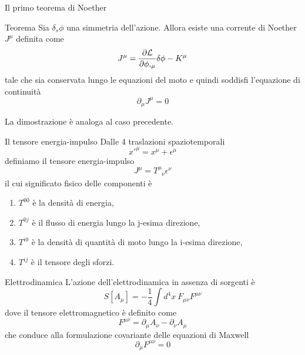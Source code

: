 \begin{frame}{Il primo teorema di Noether}
    \begin{block}{Teorema}
        Sia $\delta_s \phi$ una simmetria dell'azione. Allora esiste una corrente di Noether $J^\mu$ definita come
        \begin{equation*}
            J^\mu = \frac{\partial\mathcal L}{\partial\phi,_\mu} \delta \phi - K^\mu
        \end{equation*}
            tale che sia conservata lungo le equazioni del moto e quindi soddisfi l'equazione di continuità
        \begin{equation*} 
            \partial_\mu J^\mu = 0
        \end{equation*}
    \end{block}

    La dimostrazione è analoga al caso precedente.
\end{frame}

\begin{frame}{Il tensore energia-impulso}
    Dalle 4 traslazioni spaziotemporali
    \begin{equation*}
        x'^\mu = x^\mu + \epsilon^\mu
    \end{equation*}
    definiamo il tensore energia-impulso
    \begin{equation*} 
        J^\mu = T^\mu_{\phantom \mu \nu} \epsilon^\nu
    \end{equation*}
    il cui significato fisico delle componenti è 
    \begin{enumerate}
        \item $T^{00}$ è la densità di energia,
        \item $T^{0j}$ è il flusso di energia lungo la j-esima direzione,
        \item $T^{i0}$ è la densità di quantità di moto lungo la i-esima direzione,
        \item $T^{ij}$ è il tensore degli sforzi.
    \end{enumerate}
\end{frame}

\begin{frame}{Elettrodinamica}
    L'azione dell'elettrodinamica in assenza di sorgenti è
    \begin{equation}
        S[A_\mu] = - \frac{1}{4} \int d^4 x ~ F_{\mu\nu} F^{\mu\nu}
    \end{equation}
    dove il tensore elettromagnetico è definito come 
    \begin{equation*}
        F^{\mu\nu} = \partial_\mu A_\nu - \partial_\nu A_\mu
    \end{equation*}
    che conduce alla formulazione covariante delle equazioni di Maxwell
    \begin{equation*}
        \partial_\mu F^{\mu\nu} = 0
    \end{equation*}

\end{frame}

